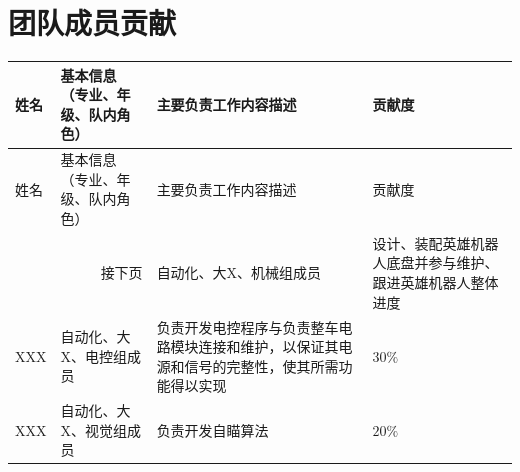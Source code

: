 \chapter{团队成员贡献}

\begin{longtable}[htbp!]{ m{1.5cm}<{\centering}  m{3.3cm}<{\centering} m{9cm}<{\centering} m{1.5cm}<{\centering} }      
\hline
姓名  &   基本信息（专业、年级、队内角色）&   主要负责工作内容描述& 贡献度 \\ 
\hline
\endfirsthead
\hline
姓名  &   基本信息（专业、年级、队内角色） &   主要负责工作内容描述& 贡献度 \\ 
\hline
\endhead
\hline
\multicolumn{2}{r}{接下页}
\endfoot
\caption{团队成员贡献}
\label{tab:团队成员贡献}
\endlastfoot

XXX & 自动化、大X、机械组成员 & 设计、装配英雄机器人底盘并参与维护、跟进英雄机器人整体进度 & $50\%$ \\
\hline
XXX & 自动化、大X、电控组成员 & 负责开发电控程序与负责整车电路模块连接和维护，以保证其电源和信号的完整性，使其所需功能得以实现 &$ 30\%$ \\
\hline
XXX & 自动化、大X、视觉组成员 & 负责开发自瞄算法 & $20\%$ \\
\hline

\end{longtable}